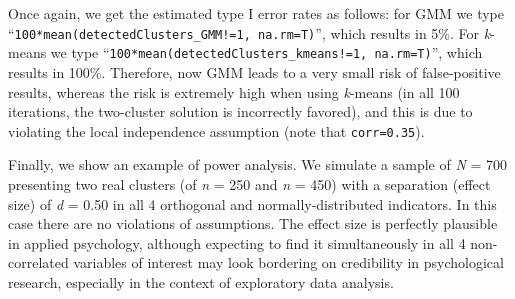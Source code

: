 \documentclass[
  man,floatsintext]{apa7}
\newenvironment{Shaded}{\begin{snugshade}}{\end{snugshade}}
\newcommand{\AttributeTok}[1]{\textcolor[rgb]{0.13,0.29,0.53}{#1}}
\newcommand{\CommentTok}[1]{\textcolor[rgb]{0.56,0.35,0.01}{\textit{#1}}}
\newcommand{\ConstantTok}[1]{\textcolor[rgb]{0.56,0.35,0.01}{#1}}
\newcommand{\ControlFlowTok}[1]{\textcolor[rgb]{0.13,0.29,0.53}{\textbf{#1}}}
\newcommand{\DecValTok}[1]{\textcolor[rgb]{0.00,0.00,0.81}{#1}}
\newcommand{\FloatTok}[1]{\textcolor[rgb]{0.00,0.00,0.81}{#1}}
\newcommand{\FunctionTok}[1]{\textcolor[rgb]{0.13,0.29,0.53}{\textbf{#1}}}
\newcommand{\NormalTok}[1]{#1}
\newcommand{\OtherTok}[1]{\textcolor[rgb]{0.56,0.35,0.01}{#1}}
\newcommand{\SpecialCharTok}[1]{\textcolor[rgb]{0.81,0.36,0.00}{\textbf{#1}}}
\begin{document}
\begin{Shaded}
\end{Shaded}

Once again, we get the estimated type I error rates as follows: for GMM we type ``\texttt{100*mean(detectedClusters\_GMM!=1,\ na.rm=T)}'', which results in 5\%. For \emph{k}-means we type ``\texttt{100*mean(detectedClusters\_kmeans!=1,\ na.rm=T)}'', which results in 100\%. Therefore, now GMM leads to a very small risk of false-positive results, whereas the risk is extremely high when using \emph{k}-means (in all 100 iterations, the two-cluster solution is incorrectly favored), and this is due to violating the local independence assumption (note that \texttt{corr=0.35}).

Finally, we show an example of power analysis. We simulate a sample of \emph{N} = 700 presenting two real clusters (of \emph{n} = 250 and \emph{n} = 450) with a separation (effect size) of \emph{d} = 0.50 in all 4 orthogonal and normally-distributed indicators. In this case there are no violations of assumptions. The effect size is perfectly plausible in applied psychology, although expecting to find it simultaneously in all 4 non-correlated variables of interest may look bordering on credibility in psychological research, especially in the context of exploratory data analysis.
\end{document}
